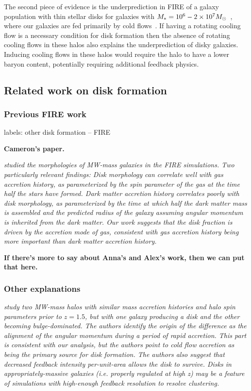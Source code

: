 \documentclass[fleqn,usenatbib]{mnras}
\begin{document}
The second piece of evidence is the underprediction in FIRE of a galaxy population with thin stellar disks for galaxies with $M_* = 10^6 \-- 2 \times 10^7 M_\odot$~\citep{El-Badry2018a}, where our galaxies are fed primarily by cold flows~\citep{Stern2020}.
If having a rotating cooling flow is a necessary condition for disk formation then the absence of rotating cooling flows in these halos also explains the underprediction of disky galaxies.
Inducing cooling flows in these halos would require the halo to have a lower baryon content, potentially requiring additional feedback physics.




\subsection{Related work on disk formation}
\label{s: other disk formation}

\subsubsection{Previous FIRE work}
label{s: other disk formation -- FIRE}

\textbf{Cameron's paper.}

\textit{
\cite{Garrison-Kimmel2018} studied the morphologies of MW-mass galaxies in the FIRE simulations.
Two particularly relevant findings:
Disk morphology can correlate well with gas accretion history, as parameterized by the spin parameter of the gas at the time half the stars have formed.
Dark matter accretion history correlates poorly with disk morphology, as parameterized by the time at which half the dark matter mass is assembled and the predicted radius of the galaxy assuming angular momentum is inherited from the dark matter.
Our work suggests that the disk fraction is driven by the accretion mode of gas, consistent with gas accretion history being more important than dark matter accretion history.
}


\textbf{If there's more to say about Anna's and Alex's work, then we can put that here.}

\subsubsection{Other explanations}
\label{s: other disk formation -- sims}

\textit{
\cite{Kretschmer2020} study two MW-mass halos with similar mass accretion histories and halo spin parameters prior to $z=1.5$, but with one galaxy producing a disk and the other becoming bulge-dominated.
The authors identify the origin of the difference as the alignment of the angular momentum during a period of rapid accretion.
This part is consistent with our analysis, but the authors point to \textit{cold flow} accretion as being the primary source for disk formation.
The authors also suggest that decreased feedback intensity per-unit-area allows the disk to survive.
Disks in appropriately-massive galaxies (i.e. properly regulated at high z) may be a feature of simulations with high-enough feedback resolution to resolve clustering.
}
\end{document}
